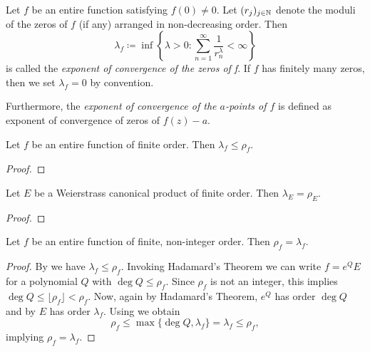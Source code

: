 \begin{definition}
    Let $f$ be an entire function satisfying $f(0) \neq 0$. Let $(r_j)_{j \in \mathbb{N}}$ denote the moduli of the zeros of $f$ (if any) arranged in non-decreasing order. Then
    $$ \lambda_f \coloneqq \inf \left\{ \lambda > 0 : \sum_{n=1}^\infty \frac{1}{r^\lambda_n} < \infty \right\} $$
    is called the \emph{exponent of convergence of the zeros of f}. If $f$ has finitely many zeros, then we set $\lambda_f = 0$ by convention.

    Furthermore, the \emph{exponent of convergence of the $a$-points of $f$} is defined as exponent of convergence of zeros of $f(z) - a$.
\end{definition}

\begin{theorem} \label{thm:inequality-order-exponent-of-convergence}
    Let $f$ be an entire function of finite order. Then $\lambda_f \leq \rho_f$.
\end{theorem}

\begin{proof}
\end{proof}

\begin{example} \label{exm:exponent-of-convergence}
\end{example}

\begin{theorem} \label{thm:exponent-of-convergence-weierstrass-product}
    Let $E$ be a Weierstrass canonical product of finite order. Then $\lambda_E = \rho_E$.
\end{theorem}

\begin{proof}
\end{proof}

\begin{theorem} \label{thm:finite-non-integer-order-equals-exponent-of-convergence}
    Let $f$ be an entire function of finite, non-integer order. Then $\rho_f = \lambda_f$.
\end{theorem}

\begin{proof}
    By  we have $\lambda_f \leq \rho_f$. Invoking Hadamard's Theorem we can write $f = e^Q E$ for a polynomial $Q$ with $\deg Q \leq \rho_f$. Since $\rho_f$ is not an integer, this implies $\deg Q \leq \lfloor \rho_f \rfloor < \rho_f$. Now, again by Hadamard's Theorem, $e^Q$ has order $\deg Q$ and by  $E$ has order $\lambda_f$. Using  we obtain
    $$ \rho_f \leq \max \{ \deg Q, \lambda_f \} = \lambda_f \leq \rho_f, $$
    implying $\rho_f = \lambda_f$.
\end{proof}


